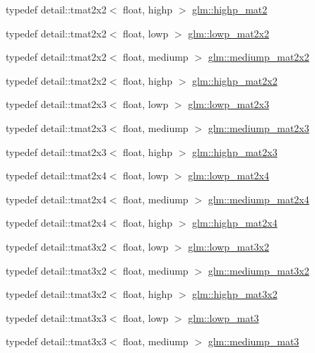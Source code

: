 \begin{CompactItemize}
\item 
typedef detail::tmat2x2$<$ float, highp $>$ \hyperlink{group__core__precision_gb9884251d84b95dbbf27aa1e4b3a1ec7}{glm::highp\_\-mat2}
\item 
typedef detail::tmat2x2$<$ float, lowp $>$ \hyperlink{group__core__precision_g7d7e123d953978cc17de6882bb10400e}{glm::lowp\_\-mat2x2}
\item 
typedef detail::tmat2x2$<$ float, mediump $>$ \hyperlink{group__core__precision_g867b486aea2d228a1e1a134af73b2c4b}{glm::mediump\_\-mat2x2}
\item 
typedef detail::tmat2x2$<$ float, highp $>$ \hyperlink{group__core__precision_g694146b8d430b22caa8b37571d9bc8bc}{glm::highp\_\-mat2x2}
\item 
typedef detail::tmat2x3$<$ float, lowp $>$ \hyperlink{group__core__precision_gef481e637af5103a83ab561d30d28f2a}{glm::lowp\_\-mat2x3}
\item 
typedef detail::tmat2x3$<$ float, mediump $>$ \hyperlink{group__core__precision_gd4e099c0dfa8f35ce9c0ddc8605428cf}{glm::mediump\_\-mat2x3}
\item 
typedef detail::tmat2x3$<$ float, highp $>$ \hyperlink{group__core__precision_g7d4e5a1c803be5688c75241c924dfa58}{glm::highp\_\-mat2x3}
\item 
typedef detail::tmat2x4$<$ float, lowp $>$ \hyperlink{group__core__precision_ga62e33ee2864909c8522a549fbf40ce5}{glm::lowp\_\-mat2x4}
\item 
typedef detail::tmat2x4$<$ float, mediump $>$ \hyperlink{group__core__precision_ge90cf4be1ded03a3a5b7b42045da253c}{glm::mediump\_\-mat2x4}
\item 
typedef detail::tmat2x4$<$ float, highp $>$ \hyperlink{group__core__precision_g3cc506666b7a95db56f9d2eb787b6e20}{glm::highp\_\-mat2x4}
\item 
typedef detail::tmat3x2$<$ float, lowp $>$ \hyperlink{group__core__precision_g17219f89f804dbf4620d4caacf32cfe2}{glm::lowp\_\-mat3x2}
\item 
typedef detail::tmat3x2$<$ float, mediump $>$ \hyperlink{group__core__precision_g1215b70c2750b6e9ab813ced8dcae568}{glm::mediump\_\-mat3x2}
\item 
typedef detail::tmat3x2$<$ float, highp $>$ \hyperlink{group__core__precision_gbc7767293ff69cd56717ee9d8be62963}{glm::highp\_\-mat3x2}
\item 
typedef detail::tmat3x3$<$ float, lowp $>$ \hyperlink{group__core__precision_gae2935658c6a3668ac1935a7f6064d51}{glm::lowp\_\-mat3}
\item 
typedef detail::tmat3x3$<$ float, mediump $>$ \hyperlink{group__core__precision_gcf45e22f1fb2703b181995676963a1f9}{glm::mediump\_\-mat3}

\end{CompactItemize}
